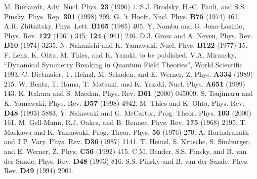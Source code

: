 \documentclass[a4paper,12pt]{article}
\begin{document}
\begin{thebibliography}{30}
M. Burkardt, Adv. Nucl. Phys. {\bf 23} (1996) 1.
S.J. Brodsky, H.-C. Pauli, and S.S. Pinsky,
Phys. Rep. {\bf 301} (1998) 299.
G. 't~Hooft, Nucl. Phys. {\bf B75} (1974) 461.
A.R. Zhitnitsky, Phys. Lett. {\bf B165} (1985) 405.
Y. Nambu and G. Jona-Lasinio, Phys. Rev. {\bf 122} (1961) 345; {\bf 124} (1961) 246.
D.J. Gross and A. Neveu, Phys. Rev. {\bf D10} (1974) 3235.
N. Nakanishi and K. Yamawaki,
Nucl. Phys. {\bf B122} (1977) 15.
F. Lenz, K. Ohta, M. Thies, and K. Yazaki, to be published.
V.A. Miransky, ``Dynamical Symmetry Breaking in Quantum Field Theories'', World Scientific 1993.
C. Dietmaier, T. Heinzl, M. Schaden, and E. Werner,
Z. Phys. {\bf A334} (1989) 215.
W. Bentz, T. Hama, T. Matsuki, and K. Yazaki,
Nucl. Phys. {\bf A651} (1999) 143.
K. Itakura and S. Maedan,
Phys. Rev. {\bf D61} (2000) 045009.
S. Tsujimaru and K. Yamawaki,
Phys. Rev. {\bf D57} (1998) 4942.
M. Thies and K. Ohta, Phys. Rev. {\bf D48} (1993) 5883.
Y. Nakawaki and G. McCartor, Prog. Theor. Phys. {\bf 103} (2000) 161.
M. Gell-Mann, R.J. Oakes, and B. Renner,
Phys. Rev. {\bf 175} (1968) 2195.
T. Maskawa and K. Yamawaki,
Prog. Theor. Phys. {\bf 56} (1976) 270.
A. Harindranath and J.P. Vary,
Phys. Rev. {\bf D36} (1987) 1141.
T. Heinzl, S. Krusche, S. Simburger, and E. Werner,
Z. Phys. {\bf C56} (1992) 415.
C.M. Bender, S.S. Pinsky, and B. van der Sande,
Phys. Rev. {\bf D48} (1993) 816.
S.S. Pinsky and B. van der Sande,
Phys. Rev. {\bf D49} (1994) 2001.
\end {thebibliography}
\end{document}
